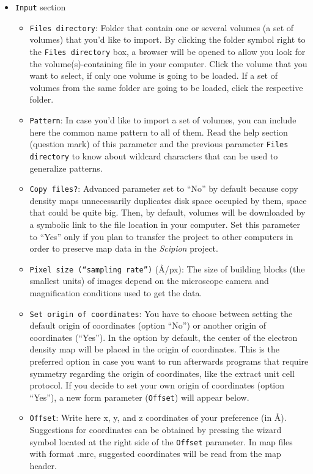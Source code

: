 \documentclass[12pt]{article} %
\def\scipion{\textit{Scipion}\xspace}
\newcommand{\ttt}[1]{\texttt{#1}}
\begin{document}
\begin{appendices}
\begin{itemize}
  \begin{itemize}
   \item \ttt{Input} section\\
  

  \begin{itemize}
   \item \ttt{Files directory}: Folder that contain one or several volumes (a set of volumes) that you'd like to import. By clicking the folder symbol right to the \ttt{Files directory} box, a browser will be opened to allow you look for the volume(s)-containing file in your computer. Click the volume that you want to select, if only one volume is going to be loaded. If a set of volumes from the same folder are going to be loaded, click the respective folder.\\
   \item \ttt{Pattern}: In case you'd like to import a set of volumes, you can include here the common name pattern to all of them. Read the help section (question mark) of this parameter and the previous parameter \ttt{Files directory} to know about wildcard characters that can be used to generalize patterns.\\
   \item \ttt{Copy files?}: Advanced parameter set to ``No'' by default because copy density maps unnecessarily duplicates disk space occupied by them, space that could be quite big. Then, by default, volumes will be downloaded by a symbolic link to the file location in your computer. Set this parameter to ``Yes'' only if you plan to transfer the project to other computers in order to preserve map data in the \scipion project.\\
   \item \ttt{Pixel size (``sampling rate'')} (\AA/px): The size of building blocks (the smallest units) of images depend on the microscope camera and magnification conditions used to get the data.\\
   \item \ttt{Set origin of coordinates}: You have to choose between setting the default origin of coordinates (option ``No'') or another origin of coordinates (``Yes''). In the option by default, the center of the electron density map will be placed in the origin of coordinates. This is the preferred option in case you want to run afterwards programs that require symmetry regarding the origin of coordinates, like the extract unit cell protocol. If you decide to set your own origin of coordinates (option ``Yes''), a new form parameter (\ttt{Offset}) will appear below.\\
   \item \ttt{Offset}: Write here x, y, and z coordinates of your preference (in \AA). Suggestions for coordinates can be obtained by pressing the wizard symbol located at the right side of the \ttt{Offset} parameter. In map files with format .mrc, suggested coordinates will be read from the map header.\\
   \end{itemize}
   

\end{itemize}
\end{itemize}
\end{appendices}
\end{document}
